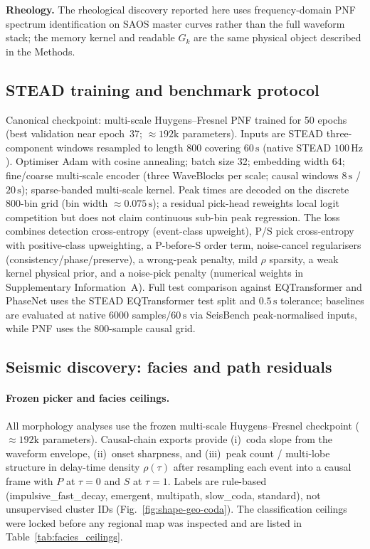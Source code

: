 \documentclass[twocolumn, 10pt]{article}
\newcommand{\pnf}{\textsc{PNF}}
\begin{document}
\textbf{Rheology.} The rheological discovery reported here uses frequency-domain PNF spectrum identification on SAOS master curves rather than the full waveform stack; the memory kernel and readable \(G_k\) are the same physical object described in the Methods.

\subsection*{STEAD training and benchmark protocol}

Canonical checkpoint: multi-scale Huygens--Fresnel \pnf{} trained for 50 epochs (best validation near epoch~37; \(\approx192\mathrm{k}\) parameters). Inputs are STEAD three-component windows resampled to length 800 covering \(60\,\mathrm{s}\) (native STEAD \(100\,\mathrm{Hz}\)). Optimiser Adam with cosine annealing; batch size 32; embedding width 64; fine/coarse multi-scale encoder (three WaveBlocks per scale; causal windows \(8\,\mathrm{s}\) / \(20\,\mathrm{s}\)); sparse-banded multi-scale kernel. Peak times are decoded on the discrete \(800\)-bin grid (bin width \(\approx0.075\,\mathrm{s}\)); a residual pick-head reweights local logit competition but does not claim continuous sub-bin peak regression. The loss combines detection cross-entropy (event-class upweight), P/S pick cross-entropy with positive-class upweighting, a P-before-S order term, noise-cancel regularisers (consistency/phase/preserve), a wrong-peak penalty, mild \(\rho\) sparsity, a weak kernel physical prior, and a noise-pick penalty (numerical weights in Supplementary Information~A). Full test comparison against EQTransformer and PhaseNet uses the STEAD EQTransformer test split and \(0.5\,\mathrm{s}\) tolerance\cite{mousavi2020eqt,zhu2018phasenet}; baselines are evaluated at native \(6000\) samples/\(60\,\mathrm{s}\) via SeisBench peak-normalised inputs, while \pnf{} uses the 800-sample causal grid.

\subsection*{Seismic discovery: facies and path residuals}

\paragraph{Frozen picker and facies ceilings.}
All morphology analyses use the frozen multi-scale Huygens--Fresnel checkpoint (\(\approx192\mathrm{k}\) parameters). Causal-chain exports provide (i)~coda slope from the waveform envelope, (ii)~onset sharpness, and (iii)~peak count / multi-lobe structure in delay-time density \(\rho(\tau)\) after resampling each event into a causal frame with \(P\) at \(\tau=0\) and \(S\) at \(\tau=1\). Labels are rule-based (impulsive\_fast\_decay, emergent, multipath, slow\_coda, standard), not unsupervised cluster IDs (Fig.~\ref{fig:shape-geo-coda}). The classification ceilings were locked before any regional map was inspected and are listed in Table~\ref{tab:facies_ceilings}.
\end{document}
